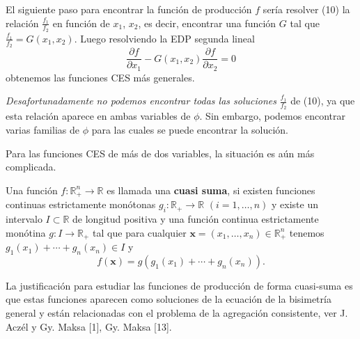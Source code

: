 \documentclass[a4paper,fleqn]{cas-dc}
\begin{document}
El siguiente paso para encontrar la función de producción $f$ sería resolver (10) la relación $\frac{f_{1}}{f_{2}}$ en función de $x_{1}$, $x_{2}$, es decir, encontrar una función $G$ tal que $\frac{f_{1}}{f_{2}}=G\left(x_{1},x_{2}\right)$. Luego resolviendo la EDP segunda lineal \[ \frac{\partial f}{\partial x_{1}}-G\left(x_{1},x_{2}\right)\frac{\partial f}{\partial x_{2}}=0 \] obtenemos las funciones CES más generales.

\emph{Desafortunadamente no podemos encontrar todas las soluciones} $\frac{f_{1}}{f_{2}}$ de (10), ya que esta relación aparece en ambas variables de $\phi$. Sin embargo, podemos encontrar varias familias de $\phi$ para las cuales se puede encontrar la solución.

Para las funciones CES de más de dos variables, la situación es aún más complicada.

\begin{definition}
Una función $f\colon\mathds{R}^{n}_{+}\rightarrow\mathds{R}$ es llamada una \textbf{cuasi suma}, si existen funciones continuas estrictamente monótonas $g_{i}\colon\mathds{R}_{+}\rightarrow\mathds{R}$ $(i=1,\ldots,n)$ y existe un intervalo $I\subset\mathds{R}$ de longitud positiva y una función continua estrictamente monótina $g\colon I\rightarrow\mathds{R}_{+}$ tal que para cualquier $\bm{x}=\left(x_{1},\ldots,x_{n}\right)\in\mathds{R}^{n}_{+}$ tenemos $g_{1}\left(x_{1}\right)+\cdots+g_{n}\left(x_{n}\right)\in I$ y
\begin{equation}
f\left(\bm{x}\right)=g\left(g_{1}\left(x_{1}\right)+\cdots+g_{n}\left(x_{n}\right)\right).
\end{equation}
\end{definition}
La justificación para estudiar las funciones de producción de forma cuasi-suma es que estas funciones aparecen como soluciones de la ecuación de la bisimetría general y están relacionadas con el problema de la agregación consistente, ver J. Aczél y Gy. Maksa [1], Gy. Maksa [13].
\end{document}
